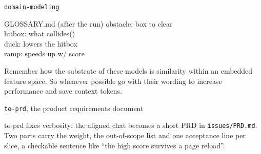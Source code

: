 \begin{frame}{\texttt{domain-modeling}}
  \begin{withmargin}
    \begin{tdmargin}
      \begin{tdcodet}{GLOSSARY.md (after the run)}
        obstacle: box to clear\\
        hitbox: what collides()\\
        duck: lowers the hitbox\\
        ramp: speeds up w/ score
      \end{tdcodet}
      \par\smallskip
      Remember how the substrate of these models is similarity within an embedded feature space.
      So whenever possible go with their wording to increase performance and save context tokens.
    \end{tdmargin}
  \end{withmargin}
\end{frame}

\begin{frame}{\texttt{to-prd}, the product requirements document}
  \begin{withmargin}
    \begin{tdmargin}
      to-prd fixes verbosity: the aligned chat becomes a short PRD in
      \texttt{issues/PRD.md}. Two parts carry the weight, the out-of-scope list and
      one \textcolor{DHBWred}{acceptance line} per slice, a checkable sentence like
      ``the high score survives a page reload''.
    \end{tdmargin}
  \end{withmargin}
\end{frame}

